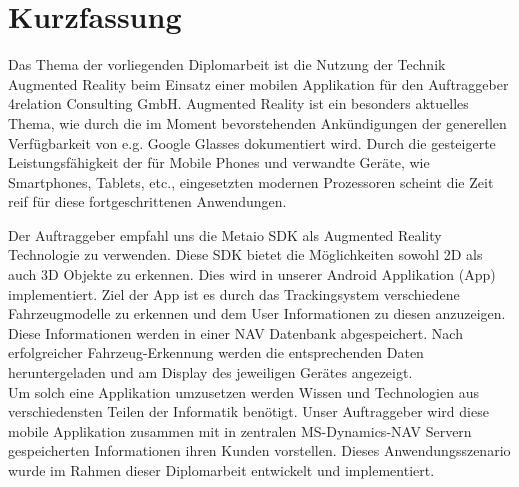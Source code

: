 \chapter*{Kurzfassung}

Das Thema der vorliegenden Diplomarbeit ist die Nutzung der Technik Augmented Reality beim Einsatz einer mobilen Applikation f{\"u}r den Auftraggeber 4relation Consulting GmbH.
Augmented Reality ist ein besonders aktuelles Thema, wie durch die im Moment bevorstehenden Ank{\"u}ndigungen der generellen Verf{\"u}gbarkeit von e.g. Google Glasses dokumentiert wird. Durch die gesteigerte Leistungsf{\"a}higkeit der f{\"u}r Mobile Phones und verwandte Ger{\"a}te, wie Smartphones, Tablets, etc., eingesetzten modernen Prozessoren scheint die Zeit reif f{\"u}r diese fortgeschrittenen Anwendungen.

Der Auftraggeber empfahl uns die Metaio SDK als Augmented Reality Technologie zu verwenden. Diese SDK bietet die M{\"o}glichkeiten sowohl 2D als auch 3D Objekte zu erkennen. Dies wird in unserer Android Applikation (App) implementiert. Ziel der App ist es durch das Trackingsystem verschiedene Fahrzeugmodelle zu erkennen und dem User Informationen zu diesen anzuzeigen. Diese Informationen werden in einer NAV Datenbank abgespeichert. Nach erfolgreicher Fahrzeug-Erkennung werden die entsprechenden Daten heruntergeladen und am Display des jeweiligen Ger{\"a}tes angezeigt.\\
Um solch eine Applikation umzusetzen werden Wissen und Technologien aus verschiedensten Teilen der Informatik benötigt. Unser Auftraggeber wird diese mobile Applikation zusammen mit in zentralen MS-Dynamics-NAV Servern gespeicherten Informationen ihren Kunden vorstellen. Dieses Anwendungsszenario wurde im Rahmen dieser Diplomarbeit entwickelt und implementiert.